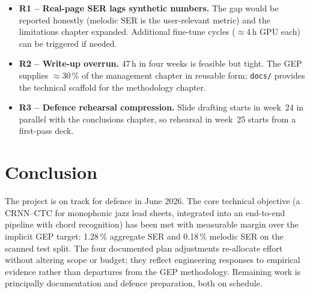 \documentclass[11pt, a4paper]{article}
\begin{document}
\begin{itemize}
    \item \textbf{R1 -- Real-page SER lags synthetic numbers.} The gap would be reported honestly (melodic SER is the user-relevant metric) and the limitations chapter expanded. Additional fine-tune cycles ($\approx$4\,h GPU each) can be triggered if needed.
    \item \textbf{R2 -- Write-up overrun.} 47\,h in four weeks is feasible but tight. The GEP supplies $\approx$30\,\% of the management chapter in reusable form; \texttt{docs/} provides the technical scaffold for the methodology chapter.
    \item \textbf{R3 -- Defence rehearsal compression.} Slide drafting starts in week~24 in parallel with the conclusions chapter, so rehearsal in week~25 starts from a first-pass deck.
\end{itemize}

\section{Conclusion}
\label{sec:conclusion}

The project is on track for defence in June 2026. The core technical objective (a CRNN--CTC for monophonic jazz lead sheets, integrated into an end-to-end pipeline with chord recognition) has been met with measurable margin over the implicit GEP target: 1.28\,\% aggregate SER and 0.18\,\% melodic SER on the scanned test split. The four documented plan adjustments re-allocate effort without altering scope or budget; they reflect engineering responses to empirical evidence rather than departures from the GEP methodology. Remaining work is principally documentation and defence preparation, both on schedule.
\end{document}
